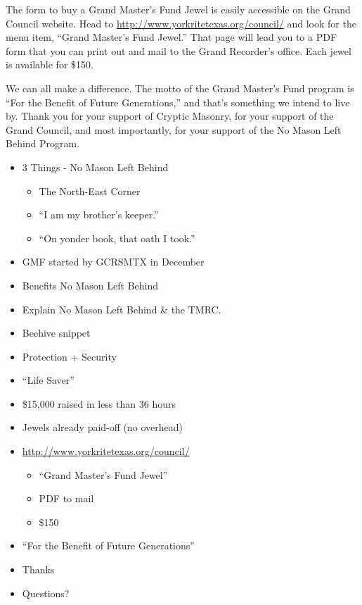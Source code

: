 \documentclass{article}
\begin{document}
		The form to buy a Grand Master's Fund Jewel is easily accessible on the Grand Council website.  Head to \url{http://www.yorkritetexas.org/council/} and look for the menu item, ``Grand Master's Fund Jewel.'' That page will lead you to a PDF form that you can print out and mail to the Grand Recorder's office. Each jewel is available for \$150.
		
		We can all make a difference. The motto of the Grand Master's Fund program is ``For the Benefit of Future Generations,'' and that's something we intend to live by. Thank you for your support of Cryptic Masonry, for your support of the Grand Council, and most importantly, for your support of the No Mason Left Behind Program.
		
		\begin{itemize}
			\item 3 Things - No Mason Left Behind
				\begin{itemize}
					\item The North-East Corner
					\item ``I am my brother's keeper.''
					\item ``On yonder book, that oath I took.''
				\end{itemize}
			\item GMF started by GCRSMTX in December
			\item Benefits No Mason Left Behind
			\item Explain No Mason Left Behind \& the TMRC.
			\item Beehive snippet
			\item Protection + Security
			\item ``Life Saver''
			\item \$15,000 raised in less than 36 hours
			\item Jewels already paid-off (no overhead)
			\item \url{http://www.yorkritetexas.org/council/}
				\begin{itemize}
					\item ``Grand Master's Fund Jewel''
					\item PDF to mail
					\item \$150
				\end{itemize}	
			\item ``For the Benefit of Future Generations''
			\item Thanks
			\item Questions?
		\end{itemize}
\end{document}
